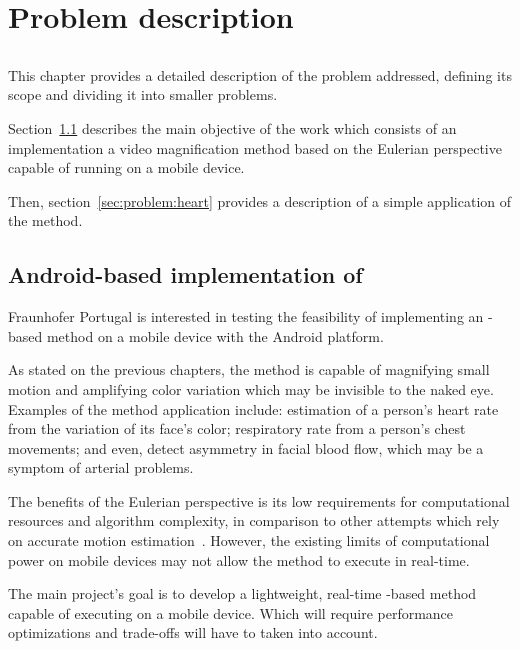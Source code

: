 \chapter{Problem description} \label{chap:problem}

\section*{}


This chapter provides a detailed description of the problem addressed, defining
its scope and dividing it into smaller problems.

Section~\ref{sec:problem:evm} describes the main objective of the work which
consists of an implementation a video magnification method based on the
Eulerian perspective capable of running on a mobile device.

Then, section~\ref{sec:problem:heart} provides a description of a simple
application of the \evm{} method.

\section{Android-based implementation of \evm} \label{sec:problem:evm}

Fraunhofer Portugal is interested in testing the feasibility of implementing an
\evm{}-based method on a mobile device with the Android platform.

As stated on the previous chapters,
the \evm{} method is capable of magnifying small
motion and amplifying color variation which may be invisible to the naked eye.
Examples of the method application include:
estimation of a person's heart rate from the variation of its face's color;
respiratory rate from a person's chest movements;
and even, detect asymmetry in facial blood flow, which may be a symptom of
arterial problems.

The benefits of the Eulerian perspective is its low requirements for
computational resources and algorithm complexity, in comparison to other
attempts which rely on accurate motion estimation~\cite{Liu2005Motion}.
However, the existing limits of computational power on mobile devices
may not allow the \evm{} method to execute in real-time.

The main project's goal is to develop a lightweight, real-time \evm{}-based
method capable of executing on a mobile device. Which will require
performance optimizations and trade-offs will have to taken into account.

